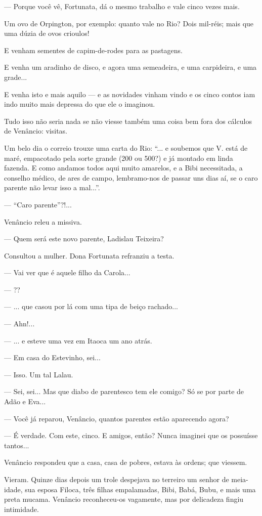 --- Porque você vê, Fortunata, dá o mesmo trabalho e vale cinco vezes
mais.

Um ovo de Orpington, por exemplo: quanto vale no Rio? Dois mil-réis;
mais que uma dúzia de ovos crioulos!

E venham sementes de capim-de-rodes para as pastagens.

E venha um aradinho de disco, e agora uma semeadeira, e uma carpideira,
e uma grade...

E venha isto e mais aquilo --- e as novidades vinham vindo e os cinco
contos iam indo muito mais depressa do que ele o imaginou.

Tudo isso não seria nada se não viesse também uma coisa bem fora dos
cálculos de Venâncio: visitas.

Um belo dia o correio trouxe uma carta do Rio: ``... e soubemos que V.
está de maré, empacotado pela sorte grande (200 ou 500?) e já montado em
linda fazenda. E como andamos todos aqui muito amarelos, e a Bibi
necessitada, a conselho médico, de ares de campo, lembramo-nos de passar
uns dias aí, se o caro parente não levar isso a mal...''.

--- ``Caro parente''?!...

Venâncio releu a missiva.

--- Quem será este novo parente, Ladislau Teixeira?

Consultou a mulher. Dona Fortunata refranziu a testa.

--- Vai ver que é aquele filho da Carola...

--- ??

--- ... que casou por lá com uma tipa de beiço rachado...

--- Ahn!...

--- ... e esteve uma vez em Itaoca um ano atrás.

--- Em casa do Estevinho, sei...

--- Isso. Um tal Lalau.

--- Sei, sei... Mas que diabo de parentesco tem ele comigo? Só se por
parte de Adão e Eva...

--- Você já reparou, Venâncio, quantos parentes estão aparecendo agora?

--- É verdade. Com este, cinco. E amigos, então? Nunca imaginei que os
possuísse tantos...

Venâncio respondeu que a casa, casa de pobres, estava às ordens; que
viessem.

Vieram. Quinze dias depois um trole despejava no terreiro um senhor de
meia-idade, sua esposa Filoca, três filhas empalamadas, Bibi, Babá,
Bubu, e mais uma preta mucama. Venâncio reconheceu-os vagamente, mas por
delicadeza fingiu intimidade.

